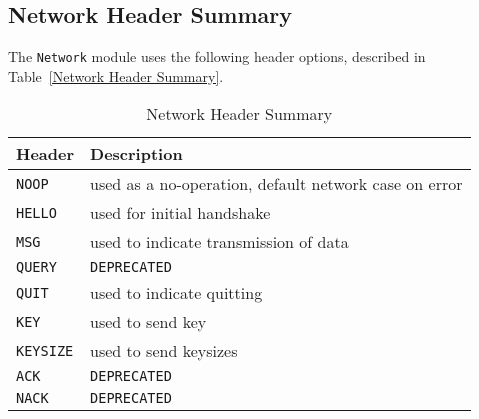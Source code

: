 \documentclass[sigconf]{acmart}
\begin{document}
\subsection{Network Header Summary}
The \texttt{Network} module uses the following header options, described in Table~\ref{Network
Header Summary}.
\begin{table}[htb]
 \centering
 \caption{Network Header Summary}
 \label{Network Header Summary}

 \begin{tabular}{|p{4em}|p{20em}|} \hline
  \textbf{Header}  & \textbf{Description}                                  \\ \hline
  \texttt{NOOP}    & used as a no-operation, default network case on error \\ \hline
  \texttt{HELLO}   & used for initial handshake                            \\ \hline
  \texttt{MSG}     & used to indicate transmission of data                 \\ \hline
  \texttt{QUERY}   & \texttt{DEPRECATED}                                   \\ \hline
  \texttt{QUIT}    & used to indicate quitting                             \\ \hline
  \texttt{KEY}     & used to send key                                      \\ \hline
  \texttt{KEYSIZE} & used to send keysizes                                 \\ \hline
  \texttt{ACK}     & \texttt{DEPRECATED}                                   \\ \hline
  \texttt{NACK}    & \texttt{DEPRECATED}                                   \\ \hline
 \end{tabular}
\end{table}
\newline
\end{document}
